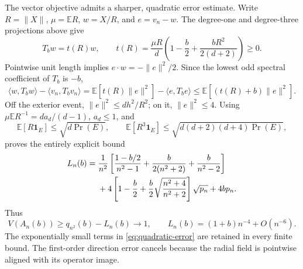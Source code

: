 \documentclass[11pt]{article}
\newcommand{\E}{\mathbb E}
\begin{document}
The vector objective admits a sharper, quadratic error estimate.
Write $R=\|X\|$, $\mu=\E R$, $w=X/R$, and $e=v_n-w$.
The degree-one and degree-three projections above give
\[
 T_bw=t(R)w,\qquad
 t(R)=\frac{\mu R}{d}
 \left(1-\frac b2+\frac{bR^2}{2(d+2)}\right)\ge0.
\]
Pointwise unit length implies $e\cdot w=-\|e\|^2/2$.
Since the lowest odd spectral coefficient of $T_b$ is $-b$,
\[
 \langle w,T_bw\rangle-\langle v_n,T_bv_n\rangle
 =\E[t(R)\|e\|^2]-\langle e,T_be\rangle
 \le\E[(t(R)+b)\|e\|^2].
\]
Off the exterior event, $\|e\|^2\le dh^2/R^2$; on it,
$\|e\|^2\le4$. Using
$\mu\E R^{-1}=d a_d/(d-1)$, $a_d\le1$, and
\[
 \E[R\mathbf1_E]\le\sqrt{d\Pr(E)},\qquad
 \E[R^3\mathbf1_E]\le\sqrt{d(d+2)(d+4)\Pr(E)},
\]
proves the entirely explicit bound
\begin{align}\label{eq:quadratic-error}
 L_n(b)={}&\frac1{n^2}\left[
 \frac{1-b/2}{n^2-1}+\frac b{2(n^2+2)}+\frac b{n^2-2}\right]\notag\\
 &+4\left[1-\frac b2+\frac b2\sqrt{\frac{n^2+4}{n^2+2}}\right]
 \sqrt{p_n}+4bp_n.
\end{align}
Thus
\begin{equation}\label{eq:vector-bound}
 V(A_n(b))\ge q_{n^2}(b)-L_n(b)\longrightarrow1,
 \qquad L_n(b)=(1+b)n^{-4}+O(n^{-6}).
\end{equation}
The exponentially small terms in \eqref{eq:quadratic-error} are retained
in every finite bound. The first-order direction error cancels because
the radial field is pointwise aligned with its operator image.
\end{document}
